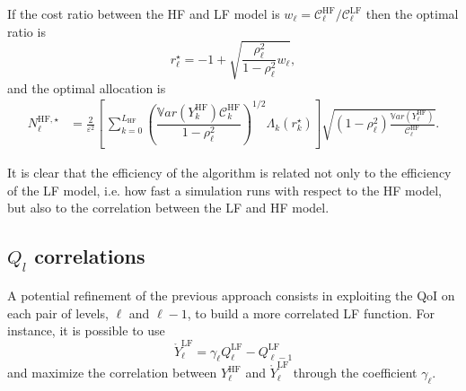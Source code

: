 If the cost ratio between the HF and LF model is $w_{\ell} =  \mathcal{C}_{\ell}^{\mathrm{HF}} / \mathcal{C}_{\ell}^{\mathrm{LF}}$ then the optimal ratio
is 
\begin{equation}
 r_\ell^{\star} = -1 + \sqrt{ \dfrac{\rho_\ell^2}{1-\rho_\ell^2} w_{\ell}},
\end{equation}
and
the optimal allocation is
\begin{equation}
 \begin{split}
  N_{\ell}^{\mathrm{HF},\star} &= \frac{2}{\varepsilon^2} \!\! \left[ \, \sum_{k=0}^{L_{\mathrm{HF}}} 
        \left( \dfrac{ \mathbb{V}ar\left(  Y_k^{ \mathrm{HF} } \right) \mathcal{C}_{k}^{\mathrm{HF}}}{1-\rho_\ell^2} \right)^{1/2} \Lambda_{k}(r_k^{\star}) \right] 
               \sqrt{ \left( 1 - \rho_\ell^2 \right) \frac{ \mathbb{V}ar\left(Y^{\mathrm{HF}}_{\ell}\right) }{\mathcal{C}_{\ell}^{\mathrm{HF}}}}.
\end{split}
\end{equation}
               
               
It is clear that the efficiency of the algorithm is related not only to the efficiency of the LF model, i.e. how fast a simulation runs with respect
to the HF model, but also to the correlation between the LF and HF model.

\subsection{$Q_l$ correlations} \label{uq:sampling:mlmf:Ycorr}

A potential refinement of the previous approach consists in exploiting the QoI on each pair of levels, $\ell$ and $\ell-1$, to 
build a more correlated LF function. For instance, it is possible to use
\begin{equation}
 \mathring{Y}^{\mathrm{LF}}_{\ell} =  \gamma_\ell Q_\ell^{\mathrm{LF}} - Q_{\ell-1}^{\mathrm{LF}}
\end{equation}
and maximize the correlation between $Y_\ell^{\mathrm{HF}}$ and $\mathring{Y}^{\mathrm{LF}}_{\ell}$ through the coefficient $\gamma_\ell$.

